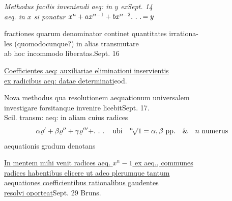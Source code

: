 \clearpage{}\NoSourceHead
\begingroup\fontsize{10}{15}\selectfont\itshape
\newcommand{\DiaryStrike}[1]{\tikz[baseline=(t.base)]{\node[inner sep=0pt,outer sep=0pt] (t) {\strut #1};\draw[line width=.55pt] ([yshift=.15ex]t.west)--([yshift=.15ex]t.east);}}
\noindent Methodus facilis inveniendi aeq: in \(y\) ex\hfill Sept. 14\\
\hspace*{2em}aeq. in \(x\) si ponatur \(x^n+ax^{n-1}+bx^{n-2}\ldotp\,\ldotp\,\ldotp=y\)

\medskip
\noindent fractiones quarum denominator continet quantitates irrationa-\\
\hspace*{2em}les (quomodocunque?) in alias transmutare\\
\hspace*{2em}ab hoc incommodo liberatas.\hfill Sept. 16

\medskip
\noindent\underline{Coefficientes aeq: auxiliariae eliminationi inservientis}\\
\hspace*{2em}\underline{ex radicibus aeq: datae determinati}\hfill eod.

\medskip
\noindent Nova methodus qua resolutionem aequationum universalem\\
\hspace*{2em}investigare forsitanque invenire licebit\hfill Sept. 17.\\
\hspace*{2em}Scil. transm: aeq: in aliam cuius radices
\[
\alpha\varrho'+\beta\varrho''+\gamma\varrho'''+\ldotp\,\ldotp\,\ldotp
\quad\text{ubi}\quad{}^n\!\surd1=\alpha,\beta\ \text{pp.}\quad\&\quad n\ \text{numerus}
\]
\hspace*{2em}aequationis gradum denotans

\medskip
\noindent\underline{In mentem mihi venit radices aeq. \(x^n-1\) ex aeq., communes}\\
\hspace*{2em}\underline{radices habentibus elicere ut adeo plerumque tantum}\\
\hspace*{2em}\underline{aequationes coefficientibus rationalibus gaudent\DiaryStrike{ibus}es}\\
\hspace*{2em}\underline{resolvi oporteat}\hfill Sept. 29 Bruns.

\medskip
\endgroup
